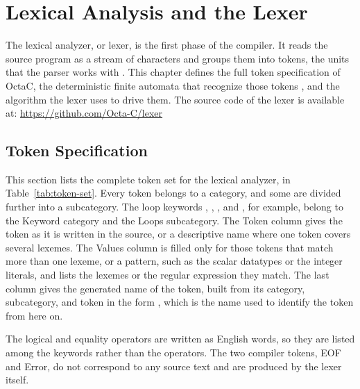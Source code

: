 
\chapter{Lexical Analysis and the Lexer}
\label{chp:lexer}

The lexical analyzer, or lexer, is the first phase of the compiler. It reads
the source program as a stream of characters and groups them into tokens,
the units that the parser works with \cite{aho2006compilers}. This chapter
defines the full token specification of OctaC, the deterministic finite
automata that recognize those tokens
\cite{aho2006compilers,hopcroft2006automata}, and the algorithm the lexer
uses to drive them. The source code of the lexer is available at:
\url{https://github.com/Octa-C/lexer}

\section{Token Specification}

This section lists the complete token set for the lexical analyzer, in
Table~\ref{tab:token-set}. Every token belongs to a category, and some are
divided further into a subcategory. The loop keywords , ,
, and , for example, belong to the Keyword category
and the Loops subcategory. The Token column gives the token as it is written
in the source, or a descriptive name where one token covers several lexemes.
The Values column is filled only for those tokens that match more than one
lexeme, or a pattern, such as the scalar datatypes or the integer literals,
and lists the lexemes or the regular expression they match. The last column
gives the generated name of the token, built from its category, subcategory,
and token in the form , which is the name
used to identify the token from here on.

The logical and equality operators are written as English words, so they are
listed among the keywords rather than the operators. The two compiler tokens,
EOF and Error, do not correspond to any source text and are produced by the
lexer itself.

